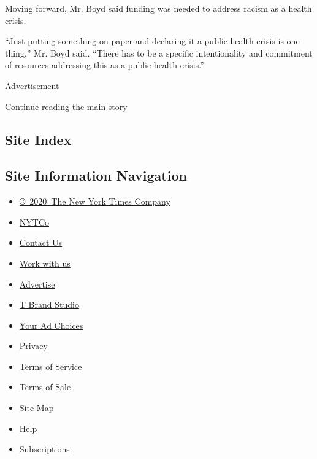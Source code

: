 Moving forward, Mr. Boyd said funding was needed to address racism as a
health crisis.

``Just putting something on paper and declaring it a public health
crisis is one thing,'' Mr. Boyd said. ``There has to be a specific
intentionality and commitment of resources addressing this as a public
health crisis.''

Advertisement

\protect\hyperlink{after-bottom}{Continue reading the main story}

\hypertarget{site-index}{%
\subsection{Site Index}\label{site-index}}

\hypertarget{site-information-navigation}{%
\subsection{Site Information
Navigation}\label{site-information-navigation}}

\begin{itemize}
\tightlist
\item
  \href{https://help.nytimes3xbfgragh.onion/hc/en-us/articles/115014792127-Copyright-notice}{©~2020~The
  New York Times Company}
\end{itemize}

\begin{itemize}
\tightlist
\item
  \href{https://www.nytco.com/}{NYTCo}
\item
  \href{https://help.nytimes3xbfgragh.onion/hc/en-us/articles/115015385887-Contact-Us}{Contact
  Us}
\item
  \href{https://www.nytco.com/careers/}{Work with us}
\item
  \href{https://nytmediakit.com/}{Advertise}
\item
  \href{http://www.tbrandstudio.com/}{T Brand Studio}
\item
  \href{https://www.nytimes3xbfgragh.onion/privacy/cookie-policy\#how-do-i-manage-trackers}{Your
  Ad Choices}
\item
  \href{https://www.nytimes3xbfgragh.onion/privacy}{Privacy}
\item
  \href{https://help.nytimes3xbfgragh.onion/hc/en-us/articles/115014893428-Terms-of-service}{Terms
  of Service}
\item
  \href{https://help.nytimes3xbfgragh.onion/hc/en-us/articles/115014893968-Terms-of-sale}{Terms
  of Sale}
\item
  \href{https://spiderbites.nytimes3xbfgragh.onion}{Site Map}
\item
  \href{https://help.nytimes3xbfgragh.onion/hc/en-us}{Help}
\item
  \href{https://www.nytimes3xbfgragh.onion/subscription?campaignId=37WXW}{Subscriptions}
\end{itemize}
